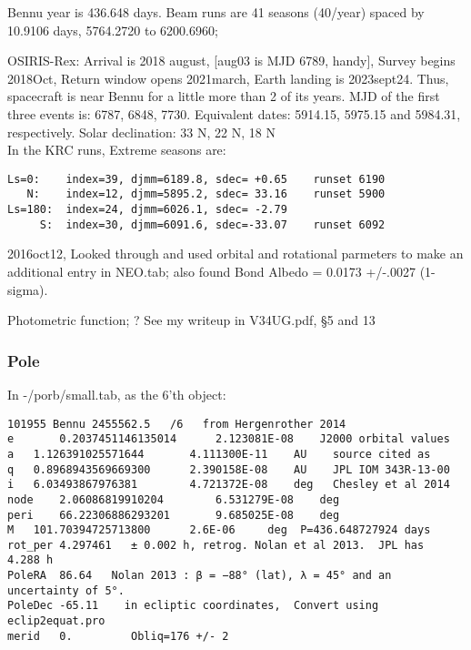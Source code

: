 \documentclass{article}
\begin{document}
Bennu year is 436.648 days.  Beam runs are 41 seasons (40/year) spaced by
10.9106 days, 5764.2720 to 6200.6960;

\vspace{2.mm} OSIRIS-Rex: Arrival is 2018 august, [aug03 is MJD 6789, handy],
Survey begins 2018Oct, Return window opens 2021march, Earth landing is
2023sept24. Thus, spacecraft is near Bennu for a little more than 2 of its
years. MJD of the first three events is: 6787, 6848, 7730.
\qi Equivalent dates:  5914.15, 5975.15 and 5984.31, respectively.
\qi Solar declination: 33 N, 22 N, 18 N 
\\ In the KRC runs, Extreme seasons are:
\vspace{-3.mm} 
\begin{verbatim}
Ls=0:    index=39, djmm=6189.8, sdec= +0.65    runset 6190
   N:    index=12, djmm=5895.2, sdec= 33.16    runset 5900
Ls=180:  index=24, djmm=6026.1, sdec= -2.79 
     S:  index=30, djmm=6091.6, sdec=-33.07    runset 6092
\end{verbatim} 

2016oct12, Looked through \qcite{} and used orbital and rotational parmeters to
make an additional entry in NEO.tab; also found Bond Albedo = 0.0173 +/-.0027
(1-sigma).

Photometric function; ? See my writeup in V34UG.pdf, \S 5 and 13

\subsubsection{Pole}

In -/porb/small.tab, as the 6'th object: 
\vspace{-3.mm} 
\begin{verbatim}
101955 Bennu 2455562.5   /6   from Hergenrother 2014
e       0.2037451146135014      2.123081E-08    J2000 orbital values 
a 	1.126391025571644       4.111300E-11	AU    source cited as 
q 	0.8968943569669300      2.390158E-08 	AU    JPL IOM 343R-13-00
i 	6.03493867976381        4.721372E-08	deg   Chesley et al 2014
node 	2.06086819910204        6.531279E-08	deg    
peri    66.22306886293201       9.685025E-08	deg
M 	101.70394725713800      2.6E-06 	deg  P=436.648727924 days
rot_per 4.297461   ± 0.002 h, retrog. Nolan et al 2013.  JPL has  4.288 h 
PoleRA  86.64   Nolan 2013 : β = −88° (lat), λ = 45° and an uncertainty of 5°.  
PoleDec -65.11    in ecliptic coordinates,  Convert using eclip2equat.pro 
merid   0.         Obliq=176 +/- 2
\end{verbatim}
\end{document}
